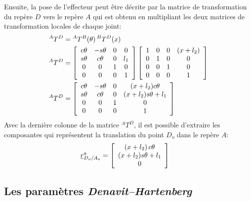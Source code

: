 Ensuite, la pose de l'effecteur peut être décrite par la matrice de transformation du repère $D$ vers le repère $A$ qui est obtenu en multipliant les deux matrices de transformation locales de chaque joint:
\begin{align}
{}^AT^D &=  {}^AT^B(\theta) \, {}^BT^D(x) \\
{}^AT^D &=
\left[ \begin{array}{c c c c}
		   c\theta & -s\theta & 0 & 0  \\
		   s\theta & c\theta  & 0 & l_1  \\
		   0 & 0 & 1              & 0  \\
		   0 & 0 & 0              & 1
\end{array} \right]
\left[ \begin{array}{c c c c}
		   1 & 0 & 0 & (x + l_2)  \\
		   0 & 1 & 0 & 0  \\
		   0 & 0 & 1 & 0  \\
		   0 & 0 & 0 & 1
\end{array} \right] \\
{}^AT^D &=
\left[ \begin{array}{c c c c}
		   c\theta & -s\theta & 0 & (x + l_2) c\theta  \\
		   s\theta & c\theta  & 0 & (x + l_2) s\theta + l_1   \\
		   0 & 0 & 1              & 0  \\
		   0 & 0 & 0              & 1
\end{array} \right]
\end{align}
Avec la dernière colonne de la matrice ${}^AT^D$, il est possible d'extraire les composantes qui représentent la translation du point $D_o$ dans le repère $A$:
\begin{align}
	\underline{r}_{D_o/A_o}^a   &=  \left[ \begin{array}{c}
										 ( x + l_2 ) \, c\theta \\ ( x + l_2 ) s\theta  + l_1 \\ 0
	\end{array} \right]
\end{align}

\newpage
\subsection{Les paramètres \textit{Denavit–Hartenberg}}

